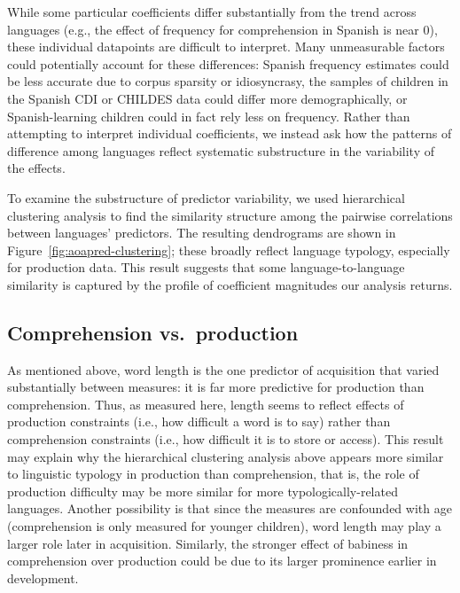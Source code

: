 \documentclass[
   11pt,
       ]{book}
\begin{document}
While some particular coefficients differ substantially from the trend across languages (e.g., the effect of frequency for comprehension in Spanish is near 0), these individual datapoints are difficult to interpret. Many unmeasurable factors could potentially account for these differences: Spanish frequency estimates could be less accurate due to corpus sparsity or idiosyncrasy, the samples of children in the Spanish CDI or CHILDES data could differ more demographically, or Spanish-learning children could in fact rely less on frequency. Rather than attempting to interpret individual coefficients, we instead ask how the patterns of difference among languages reflect systematic substructure in the variability of the effects.

To examine the substructure of predictor variability, we used hierarchical clustering analysis to find the similarity structure among the pairwise correlations between languages' predictors. The resulting dendrograms are shown in Figure~\ref{fig:aoapred-clustering}; these broadly reflect language typology, especially for production data. This result suggests that some language-to-language similarity is captured by the profile of coefficient magnitudes our analysis returns.

\hypertarget{comprehension-vs.-production}{%
\subsection{Comprehension vs.~production}\label{comprehension-vs.-production}}

As mentioned above, word length is the one predictor of acquisition that varied substantially between measures: it is far more predictive for production than comprehension. Thus, as measured here, length seems to reflect effects of production constraints (i.e., how difficult a word is to say) rather than comprehension constraints (i.e., how difficult it is to store or access). This result may explain why the hierarchical clustering analysis above appears more similar to linguistic typology in production than comprehension, that is, the role of production difficulty may be more similar for more typologically-related languages. Another possibility is that since the measures are confounded with age (comprehension is only measured for younger children), word length may play a larger role later in acquisition. Similarly, the stronger effect of babiness in comprehension over production could be due to its larger prominence earlier in development.
\end{document}
